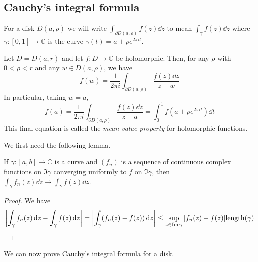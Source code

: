 \subsection{Cauchy's integral formula}
For a disk \( D(a,\rho) \) we will write \( \int_{\partial D(a,\rho)} f(z) \dd{z} \) to mean \( \int_\gamma f(z) \dd{z} \) where \( \gamma \colon [0,1] \to \mathbb C \) is the curve \( \gamma(t) = a+\rho e^{2\pi i t} \).
\begin{theorem}
	Let \( D = D(a,r) \) and let \( f \colon D \to \mathbb C \) be holomorphic.
	Then, for any \( \rho \) with \( 0 < \rho < r \) and any \( w \in D(a,\rho) \), we have
	\[ f(w) = \frac{1}{2\pi i} \int_{\partial D(a,\rho)} \frac{f(z) \dd{z}}{z-w} \]
	In particular, taking \( w = a \),
	\[ f(a) = \frac{1}{2\pi i} \int_{\partial D(a,\rho)} \frac{f(z) \dd{z}}{z-a} = \int_0^1 f(a+\rho e^{2\pi i t}) \dd{t} \]
	This final equation is called the \textit{mean value property} for holomorphic functions.
\end{theorem}
We first need the following lemma.
\begin{lemma}
	If \( \gamma \colon [a,b] \to \mathbb C \) is a curve and \( (f_n) \) is a sequence of continuous complex functions on \( \Im \gamma \) converging uniformly to \( f \) on \( \Im\gamma \), then \( \int_\gamma f_n(z) \dd{z} \to \int_\gamma f(z) \dd{z} \).
\end{lemma}
\begin{proof}
	We have
	\[ \abs{\int_\gamma f_n(z) \dd{z} - \int_\gamma f(z) \dd{z}} = \abs{\int_\gamma (f_n(z) - f(z)) \dd{z}} \leq \sup_{z \in \Im \gamma} \abs{f_n(z) - f(z)} \mathrm{length}(\gamma) \]
\end{proof}
We can now prove Cauchy's integral formula for a disk.
